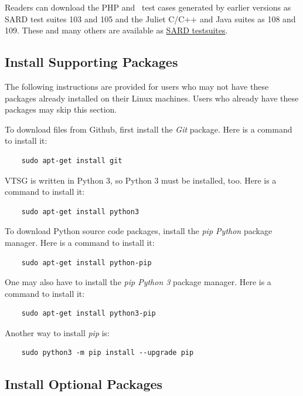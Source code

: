Readers can download the PHP and \CSharp\ test cases generated by earlier
versions as SARD test suites 103 and 105 and the Juliet C/C++ and Java suites as 
108 and 109.  These and many others are available as
\href{https://samate.nist.gov/SARD/testsuite.php}{SARD testsuites}.


\subsection{Install Supporting Packages}

\noindent The following instructions are provided for users who may not have these
packages already installed on their Linux machines. Users who already have these
packages may skip this section.

\noindent To download files from Github, first install the \emph{Git} package.
Here is a command to install it:

\begin{verbatim}
    sudo apt-get install git    
\end{verbatim}

\noindent VTSG is written in Python 3, so Python 3 must be installed, too.
Here is a command to install it:

\begin{verbatim}
    sudo apt-get install python3
\end{verbatim}

\noindent To download Python source code packages, install the \emph{pip
Python} package manager.
Here is a command to install it:

\begin{verbatim}
    sudo apt-get install python-pip
\end{verbatim}

\noindent One may also have to install the \emph{pip Python 3} package manager.
Here is a command to install it:

\begin{verbatim}
    sudo apt-get install python3-pip
\end{verbatim}

\noindent Another way to install \emph{pip} is:

\begin{verbatim}
    sudo python3 -m pip install --upgrade pip
\end{verbatim}

\subsection{Install Optional Packages}

